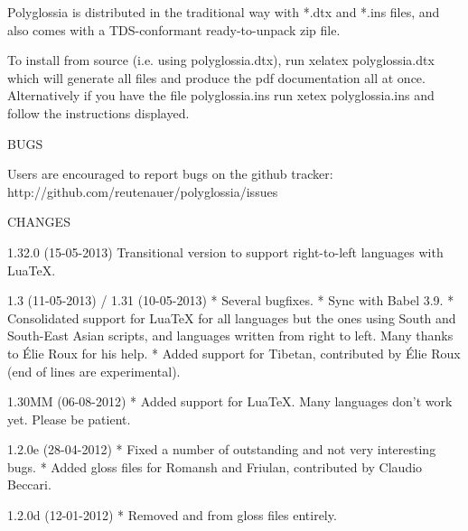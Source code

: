 Polyglossia is distributed in the traditional way with *.dtx and *.ins files,
and also comes with a TDS-conformant ready-to-unpack zip file.

To install from source (i.e. using polyglossia.dtx), run
xelatex polyglossia.dtx
which will generate all files and produce the pdf documentation all at once.
Alternatively if you have the file polyglossia.ins run
xetex polyglossia.ins
and follow the instructions displayed.

BUGS

Users are encouraged to report bugs on the github tracker:
http://github.com/reutenauer/polyglossia/issues

CHANGES

1.32.0 (15-05-2013)
  Transitional version to support right-to-left languages with LuaTeX.

1.3 (11-05-2013) / 1.31 (10-05-2013)
  * Several bugfixes.
  * Sync with Babel 3.9.
  * Consolidated support for LuaTeX for all languages but the ones using
    South and South-East Asian scripts, and languages written from right
    to left.  Many thanks to Élie Roux for his help.
  * Added support for Tibetan, contributed by Élie Roux (end of lines are experimental).

1.30MM (06-08-2012)
  * Added support for LuaTeX.  Many languages don’t work yet.  Please be
    patient.

1.2.0e (28-04-2012)
  * Fixed a number of outstanding and not very interesting bugs.
  * Added gloss files for Romansh and Friulan, contributed by Claudio
    Beccari.

1.2.0d (12-01-2012)
  * Removed \makeatletter and \makeother from gloss files entirely.

